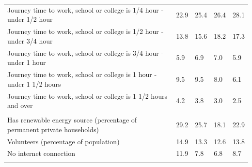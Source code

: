 \documentclass{article}
\begin{document}
\begin{table}[h]
\begin{tabular}{KTTTT}
Journey time to work, school or college is 1/4 hour - under 1/2 hour & 22.9& 25.4& 26.4& 28.1\\
Journey time to work, school or college is 1/2 hour - under 3/4 hour & 13.8& 15.6& 18.2& 17.3\\
Journey time to work, school or college is 3/4 hour - under 1 hour & 5.9& 6.9& 7.0& 5.9\\
Journey time to work, school or college is 1 hour - under 1 1/2 hours & 9.5& 9.5& 8.0& 6.1\\
Journey time to work, school or college is 1 1/2 hours and over & 4.2& 3.8& 3.0& 2.5\\
\hline
    \\ 
    \hline
Has renewable energy source (percentage of permanent private households) & 29.2& 25.7& 18.1& 22.9\\
    \hline
Volunteers (percentage of population) & 14.9& 13.3& 12.6& 13.8\\
    \hline
No internet connection& 11.9&  7.8&  6.8&  8.7\\
\hline
\end{tabular}
\end{table}
\end{document}
